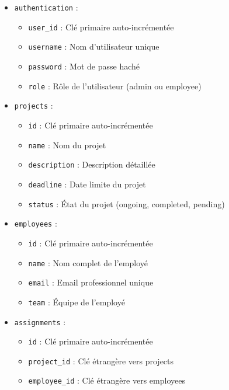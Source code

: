 \documentclass[12pt,a4paper]{article}
\begin{document}
\begin{itemize}
    \item \texttt{authentication} : 
    \begin{itemize}
        \item \texttt{user\_id} : Clé primaire auto-incrémentée
        \item \texttt{username} : Nom d'utilisateur unique
        \item \texttt{password} : Mot de passe haché
        \item \texttt{role} : Rôle de l'utilisateur (admin ou employee)
    \end{itemize}

    \item \texttt{projects} :
    \begin{itemize}
        \item \texttt{id} : Clé primaire auto-incrémentée
        \item \texttt{name} : Nom du projet
        \item \texttt{description} : Description détaillée
        \item \texttt{deadline} : Date limite du projet
        \item \texttt{status} : État du projet (ongoing, completed, pending)
    \end{itemize}

    \item \texttt{employees} :
    \begin{itemize}
        \item \texttt{id} : Clé primaire auto-incrémentée
        \item \texttt{name} : Nom complet de l'employé
        \item \texttt{email} : Email professionnel unique
        \item \texttt{team} : Équipe de l'employé
    \end{itemize}

    \item \texttt{assignments} :
    \begin{itemize}
        \item \texttt{id} : Clé primaire auto-incrémentée
        \item \texttt{project\_id} : Clé étrangère vers projects
        \item \texttt{employee\_id} : Clé étrangère vers employees
    \end{itemize}


\end{itemize}
\end{document}
